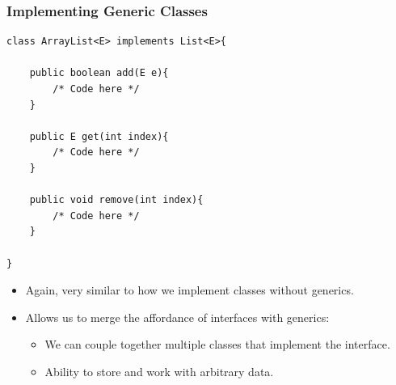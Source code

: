 \documentclass{beamer}
\begin{document}
\begin{frame}[fragile]
    \frametitle{Implementing Generic Classes}
    \begin{minipage}{0.49\textwidth}
        \begin{lstlisting}[basicstyle=\tiny]
class ArrayList<E> implements List<E>{

    public boolean add(E e){
        /* Code here */
    }

    public E get(int index){
        /* Code here */
    }

    public void remove(int index){
        /* Code here */
    }

}
        \end{lstlisting}
    \end{minipage}
    \begin{minipage}{0.49\textwidth}
        \begin{itemize}
            \item Again, very similar to how we implement classes without generics.
            \item Allows us to merge the affordance of interfaces with generics:
                \begin{itemize}
                    \item We can couple together multiple classes that implement the interface.
                    \item Ability to store and work with arbitrary data.
                \end{itemize}
        \end{itemize}
    \end{minipage}
\end{frame}
\end{document}
